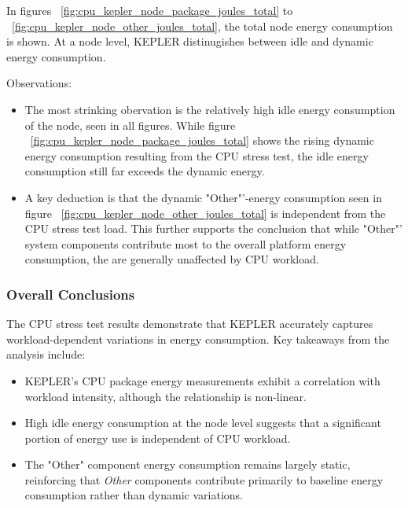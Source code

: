 In figures ~\ref{fig:cpu_kepler_node_package_joules_total} to ~\ref{fig:cpu_kepler_node_other_joules_total}, the total node energy consumption is shown. At a node level, KEPLER distinugishes between idle and dynamic energy consumption.

Observations:
\begin{itemize}
\item The most strinking obervation is the relatively high idle energy consumption of the node, seen in all figures. While figure ~\ref{fig:cpu_kepler_node_package_joules_total} shows the rising dynamic energy consumption resulting from the CPU stress test, the idle energy consumption still far exceeds the dynamic energy.
\item A key deduction is that the dynamic "Other"'-energy consumption seen in figure ~\ref{fig:cpu_kepler_node_other_joules_total} is independent from the CPU stress test load. This further supports the conclusion that while "Other"' system components contribute most to the overall platform energy consumption, the are generally unaffected by CPU workload.
\end{itemize}

\subsubsection{Overall Conclusions}
The CPU stress test results demonstrate that KEPLER accurately captures workload-dependent variations in energy consumption. Key takeaways from the analysis include:
\begin{itemize}
    \item KEPLER's CPU package energy measurements exhibit a correlation with workload intensity, although the relationship is non-linear.
    \item High idle energy consumption at the node level suggests that a significant portion of energy use is independent of CPU workload.
    \item The "Other" component energy consumption remains largely static, reinforcing that \textit{Other} components contribute primarily to baseline energy consumption rather than dynamic variations.
\end{itemize}



